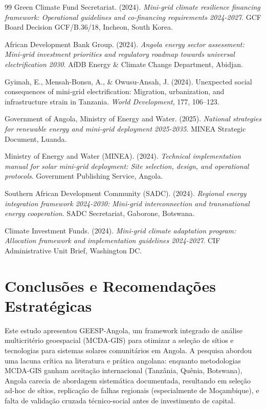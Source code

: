 \documentclass[12pt, a4paper]{article}
\begin{document}
{{{{{{{{{{{{\begin{thebibliography}{99}
 Green Climate Fund Secretariat. (2024). \textit{Mini-grid climate resilience financing framework: Operational guidelines and co-financing requirements 2024-2027}. GCF Board Decision GCF/B.36/18, Incheon, South Korea.

 African Development Bank Group. (2024). \textit{Angola energy sector assessment: Mini-grid investment priorities and regulatory roadmap towards universal electrification 2030}. AfDB Energy & Climate Change Department, Abidjan.

 Gyimah, E., Mensah-Bonsu, A., \& Owusu-Ansah, J. (2024). Unexpected social consequences of mini-grid electrification: Migration, urbanization, and infrastructure strain in Tanzania. \textit{World Development}, 177, 106--123.

 Government of Angola, Ministry of Energy and Water. (2025). \textit{National strategies for renewable energy and mini-grid deployment 2025-2035}. MINEA Strategic Document, Luanda.

 Ministry of Energy and Water (MINEA). (2024). \textit{Technical implementation manual for solar mini-grid deployment: Site selection, design, and operational protocols}. Government Publishing Service, Angola.

 Southern African Development Community (SADC). (2024). \textit{Regional energy integration framework 2024-2030: Mini-grid interconnection and transnational energy cooperation}. SADC Secretariat, Gaborone, Botswana.

 Climate Investment Funds. (2024). \textit{Mini-grid climate adaptation program: Allocation framework and implementation guidelines 2024-2027}. CIF Administrative Unit Brief, Washington DC.

\end{thebibliography}

\clearpage
\section{Conclusões e Recomendações Estratégicas}

Este estudo apresentou GEESP-Angola, um framework integrado de análise multicritério geoespacial (MCDA-GIS) para otimizar a seleção de sítios e tecnologias para sistemas solares comunitários em Angola. A pesquisa abordou uma lacuna crítica na literatura e prática angolana: enquanto metodologias MCDA-GIS ganham aceitação internacional (Tanzânia, Quênia, Botswana), Angola carecia de abordagem sistemática documentada, resultando em seleção ad-hoc de sítios, replicação de falhas regionais (especialmente de Moçambique), e falta de validação cruzada técnico-social antes de investimento de capital.

}}}}}}}}}}}}
\end{document}

